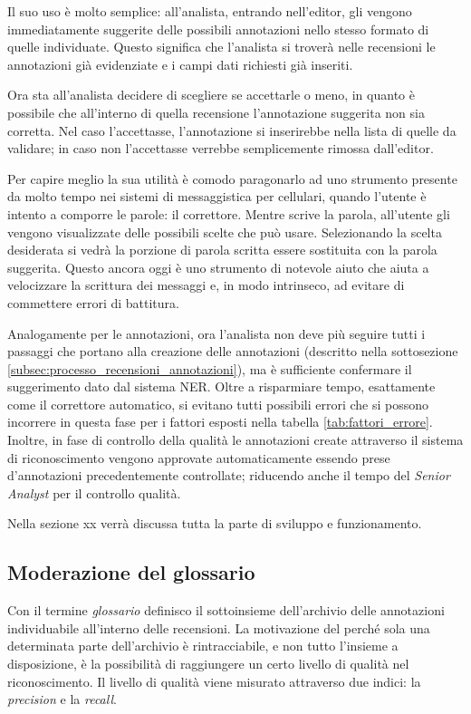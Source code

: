 Il suo uso è molto semplice: all'analista, entrando nell'editor, gli vengono
immediatamente suggerite delle possibili annotazioni nello stesso formato di
quelle individuate. Questo significa che l'analista si troverà nelle recensioni
le annotazioni già evidenziate e i campi dati richiesti già inseriti.

Ora sta all'analista decidere di scegliere se accettarle o meno, in quanto è
possibile che all'interno di quella recensione l'annotazione suggerita non sia
corretta. Nel caso l'accettasse, l'annotazione si inserirebbe nella lista di
quelle da validare; in caso non l'accettasse verrebbe semplicemente rimossa
dall'editor.

Per capire meglio la sua utilità è comodo paragonarlo ad uno strumento presente
da molto tempo nei sistemi di messaggistica per cellulari, quando l'utente è
intento a comporre le parole: il correttore. Mentre scrive la parola,
all'utente gli vengono visualizzate delle possibili scelte che può usare.
Selezionando la scelta desiderata si vedrà la porzione di parola scritta essere
sostituita con la parola suggerita. Questo ancora oggi è uno strumento di
notevole aiuto che aiuta a velocizzare la scrittura dei messaggi e, in modo
intrinseco, ad evitare di commettere errori di battitura.

Analogamente per le annotazioni, ora l'analista non deve più seguire tutti i
passaggi che portano alla creazione delle annotazioni (descritto nella
sottosezione \ref{subsec:processo_recensioni_annotazioni}), ma è sufficiente
confermare il suggerimento dato dal sistema \gls{NER}. Oltre a risparmiare
tempo, esattamente come il correttore automatico, si evitano tutti possibili
errori che si possono incorrere in questa fase per i fattori esposti nella
tabella \ref{tab:fattori_errore}. Inoltre, in fase di controllo della qualità le
annotazioni create attraverso il sistema di riconoscimento vengono approvate
automaticamente essendo prese d'annotazioni precedentemente controllate;
riducendo anche il tempo del \textit{Senior Analyst} per il controllo qualità.

Nella sezione xx verrà discussa tutta la parte di sviluppo e funzionamento.

\subsection{Moderazione del glossario}
Con il termine \textit{glossario} definisco il sottoinsieme dell'archivio
delle annotazioni individuabile all'interno delle recensioni. La motivazione del
perché sola una determinata parte dell'archivio è rintracciabile, e non tutto
l'insieme a disposizione, è la possibilità di raggiungere un certo livello di
qualità nel riconoscimento. Il livello di qualità viene misurato attraverso due
indici: la \textit{precision} e la \textit{recall}.

